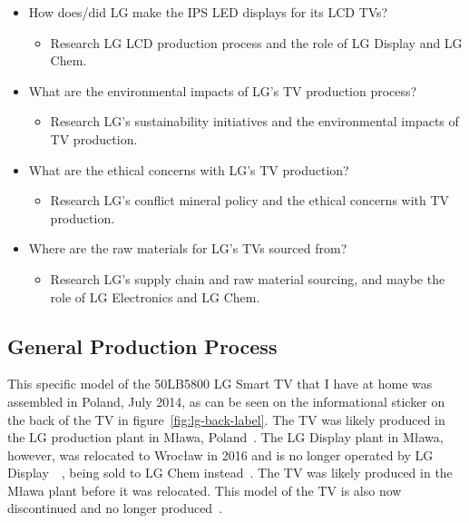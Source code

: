 \documentclass[12pt, letterpaper]{article}
\begin{document}
\begin{itemize}
  \item How does/did LG make the IPS LED displays for its LCD TVs?
    \begin{itemize}
      \item Research LG LCD production process and the role of LG
        Display and LG Chem.
    \end{itemize}

  \item What are the environmental impacts of LG's TV production
    process?
    \begin{itemize}
      \item Research LG's sustainability initiatives and the
        environmental impacts of TV production.
    \end{itemize}

  \item What are the ethical concerns with LG's TV production?
    \begin{itemize}
      \item Research LG's conflict mineral policy and the ethical
        concerns with TV production.
    \end{itemize}

  \item Where are the raw materials for LG's TVs sourced from?
    \begin{itemize}
      \item Research LG's supply chain and raw material sourcing, and
        maybe the role of LG Electronics and LG Chem.
    \end{itemize}
\end{itemize}

\subsection{General Production Process}

This specific model of the 50LB5800 LG Smart TV that I have at home
was assembled in Poland, July 2014, as can be seen on the
informational sticker on the back of the TV in
figure~\ref{fig:lg-back-label}. The TV was likely produced in the LG
production plant in Mława, Poland~\autocite{lg-2020}. The LG Display
plant in Mława, however, was relocated to Wrocław in 2016 and is no
longer operated by LG
Display~\autocite{allen-2016}~\autocite{evertiq-ab-2016}, being sold
to LG Chem instead~\autocite{shah-2024}. The TV was likely produced
in the Mława plant before it was relocated. This model of the TV is
also now discontinued and no longer produced~\autocite{unknown-author-no-dateB}.
\end{document}
